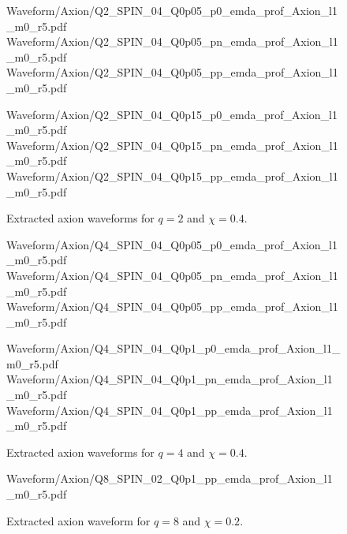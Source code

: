\begin{figure}[p]
\centering

{Waveform/Axion/Q2_SPIN_04_Q0p05_p0_emda_prof_Axion_l1_m0_r5.pdf}
\hfill
{}
{Waveform/Axion/Q2_SPIN_04_Q0p05_pn_emda_prof_Axion_l1_m0_r5.pdf}
\hfill
{}
{Waveform/Axion/Q2_SPIN_04_Q0p05_pp_emda_prof_Axion_l1_m0_r5.pdf}

\vspace{0.6em}

{Waveform/Axion/Q2_SPIN_04_Q0p15_p0_emda_prof_Axion_l1_m0_r5.pdf}
\hfill
{}
{Waveform/Axion/Q2_SPIN_04_Q0p15_pn_emda_prof_Axion_l1_m0_r5.pdf}
\hfill
{}
{Waveform/Axion/Q2_SPIN_04_Q0p15_pp_emda_prof_Axion_l1_m0_r5.pdf}

\caption{Extracted axion waveforms for $q=2$ and $\chi=0.4$.}
\label{fig:axion_catalog_q2_chi04}
\end{figure}

\begin{figure}[p]
\centering

{Waveform/Axion/Q4_SPIN_04_Q0p05_p0_emda_prof_Axion_l1_m0_r5.pdf}
\hfill
{}
{Waveform/Axion/Q4_SPIN_04_Q0p05_pn_emda_prof_Axion_l1_m0_r5.pdf}
\hfill
{}
{Waveform/Axion/Q4_SPIN_04_Q0p05_pp_emda_prof_Axion_l1_m0_r5.pdf}
\vspace{0.6em}

{Waveform/Axion/Q4_SPIN_04_Q0p1_p0_emda_prof_Axion_l1_m0_r5.pdf}
\hfill
{}
{Waveform/Axion/Q4_SPIN_04_Q0p1_pn_emda_prof_Axion_l1_m0_r5.pdf}
\hfill
{}
{Waveform/Axion/Q4_SPIN_04_Q0p1_pp_emda_prof_Axion_l1_m0_r5.pdf}
\caption{Extracted axion waveforms for $q=4$ and $\chi=0.4$.}
\label{fig:axion_catalog_q4_chi04}
\end{figure}

\begin{figure}[p]
\centering

{Waveform/Axion/Q8_SPIN_02_Q0p1_pp_emda_prof_Axion_l1_m0_r5.pdf}

\caption{Extracted axion waveform for $q=8$ and $\chi=0.2$.}
\label{fig:axion_catalog_q8_chi02}
\end{figure}
